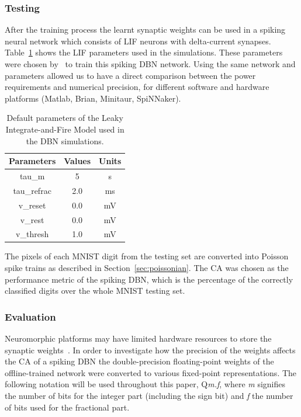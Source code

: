 \subsubsection{Testing}
After the training process the learnt synaptic weights can be used in a spiking neural network which consists of LIF neurons with delta-current synapses. Table~\ref{Tab:NeuralParams} shows the LIF parameters used in the simulations.
These parameters were chosen by~\cite{o2013real} to train this spiking DBN network. 
Using the same network and parameters allowed us to have a direct comparison between the power requirements and numerical precision, for different software and hardware platforms (Matlab, Brian, Minitaur, SpiNNaker).

\begin{table}[hbbp]
	\centering
	\caption{\label{Tab:NeuralParams}Default parameters of the Leaky Integrate-and-Fire Model used in the DBN simulations.}
	\bgroup
	\def\arraystretch{1.3}
	\begin{tabular}{c c c}
		Parameters & Values & Units \\
		\hline
		tau\_m & 5 & s\\
		tau\_refrac & 2.0 & ms\\
		v\_reset & 0.0 & mV\\
		v\_rest & 0.0 & mV\\
		v\_thresh & 1.0 & mV\\
	\end{tabular}
	\egroup
\end{table}

The pixels of each MNIST digit from the testing set are converted into Poisson spike trains as described in Section~\ref{sec:poissonian}. %
The CA was chosen as the performance metric of the spiking DBN, which is the percentage of the correctly classified digits over the whole MNIST testing set.

\subsubsection{Evaluation}
Neuromorphic platforms may have limited hardware resources to store the synaptic weights~\cite{schemmel2010wafer,merolla2014million}. In order to investigate how the precision of the weights affects the CA of a spiking DBN the double-precision floating-point weights of the offline-trained network were converted to various fixed-point representations. The following notation will be used throughout this paper, Q\textit{m.f}, where \textit{m} signifies the number of bits for the integer part (including the sign bit) and \textit{f} the number of bits used for the fractional part.


